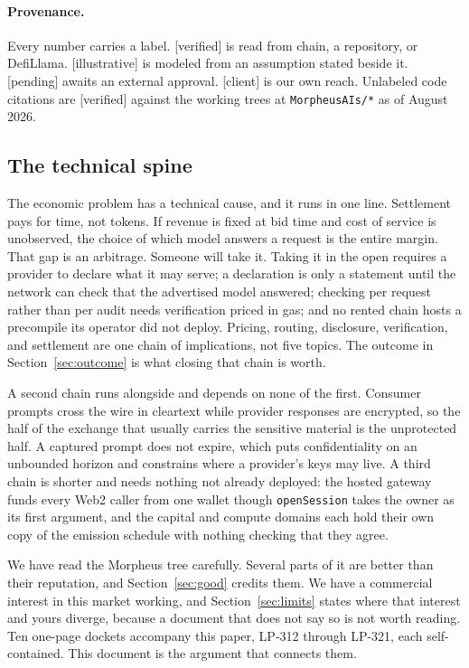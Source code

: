 \documentclass[11pt,a4paper]{article}
\newcommand{\code}[1]{\texttt{\small #1}}
\begin{document}
\paragraph{Provenance.} Every number carries a label. [verified] is read from
chain, a repository, or DefiLlama. [illustrative] is modeled from an assumption
stated beside it. [pending] awaits an external approval. [client] is our own
reach. Unlabeled code citations are [verified] against the working trees at
\code{MorpheusAIs/*} as of August 2026.

\subsection{The technical spine}

The economic problem has a technical cause, and it runs in one line. Settlement
pays for time, not tokens. If revenue is fixed at bid time and cost of service is
unobserved, the choice of which model answers a request is the entire margin.
That gap is an arbitrage. Someone will take it. Taking it in the open requires a
provider to declare what it may serve; a declaration is only a statement until
the network can check that the advertised model answered; checking per request
rather than per audit needs verification priced in gas; and no rented chain hosts
a precompile its operator did not deploy. Pricing, routing, disclosure,
verification, and settlement are one chain of implications, not five topics. The
outcome in Section~\ref{sec:outcome} is what closing that chain is worth.

A second chain runs alongside and depends on none of the first. Consumer prompts
cross the wire in cleartext while provider responses are encrypted, so the half
of the exchange that usually carries the sensitive material is the unprotected
half. A captured prompt does not expire, which puts confidentiality on an
unbounded horizon and constrains where a provider's keys may live. A third chain
is shorter and needs nothing not already deployed: the hosted gateway funds every
Web2 caller from one wallet though \code{openSession} takes the owner as its first
argument, and the capital and compute domains each hold their own copy of the
emission schedule with nothing checking that they agree.

We have read the Morpheus tree carefully. Several parts of it are better than
their reputation, and Section~\ref{sec:good} credits them. We have a commercial
interest in this market working, and Section~\ref{sec:limits} states where that
interest and yours diverge, because a document that does not say so is not worth
reading. Ten one-page dockets accompany this paper, LP-312 through LP-321, each
self-contained. This document is the argument that connects them.
\end{document}

